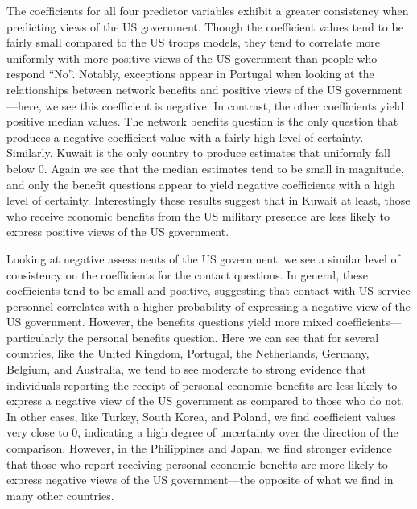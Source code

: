 The coefficients for all four predictor variables exhibit a greater consistency when predicting views of the US government. Though the coefficient values tend to be fairly small compared to the US troops models, they tend to correlate more uniformly with more positive views of the US government than people who respond ``No''. Notably, exceptions appear in Portugal when looking at the relationships between network benefits and positive views of the US government---here, we see this coefficient is negative. In contrast, the other coefficients yield positive median values. The network benefits question is the only question that produces a negative coefficient value with a fairly high level of certainty.  Similarly, Kuwait is the only country to produce estimates that uniformly fall below 0. Again we see that the median estimates tend to be small in magnitude, and only the benefit questions appear to yield negative coefficients with a high level of certainty. Interestingly these results suggest that in Kuwait at least, those who receive economic benefits from the US military presence are less likely to express positive views of the US government. 

Looking at negative assessments of the US government, we see a similar level of consistency on the coefficients for the contact questions. In general, these coefficients tend to be small and positive, suggesting that contact with US service personnel correlates with a higher probability of expressing a negative view of the US government. However, the benefits questions yield more mixed coefficients---particularly the personal benefits question. Here we can see that for several countries, like the United Kingdom, Portugal, the Netherlands, Germany, Belgium, and Australia, we tend to see moderate to strong evidence that individuals reporting the receipt of personal economic benefits are less likely to express a negative view of the US government as compared to those who do not. In other cases, like Turkey, South Korea, and Poland, we find coefficient values very close to 0, indicating a high degree of uncertainty over the direction of the comparison. However, in the Philippines and Japan, we find stronger evidence that those who report receiving personal economic benefits are more likely to express negative views of the US government---the opposite of what we find in many other countries. 

